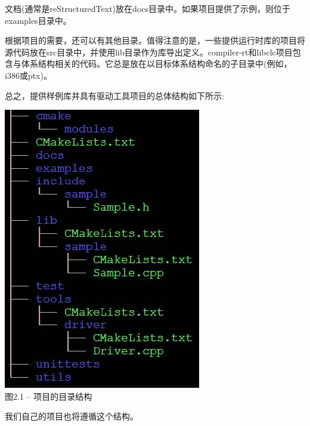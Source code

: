文档(通常是reStructuredText)放在docs目录中。如果项目提供了示例，则位于examples目录中。\par

根据项目的需要，还可以有其他目录。值得注意的是，一些提供运行时库的项目将源代码放在src目录中，并使用lib目录作为库导出定义。compiler-rt和libclc项目包含与体系结构相关的代码。它总是放在以目标体系结构命名的子目录中(例如，i386或ptx)。\par

总之，提供样例库并具有驱动工具项目的总体结构如下所示:\par

\hspace*{\fill} \par %
\begin{center}
	\includegraphics{content/1/chapter2/images/1.jpg}\\
	图2.1 – 项目的目录结构
\end{center}

我们自己的项目也将遵循这个结构。\par









